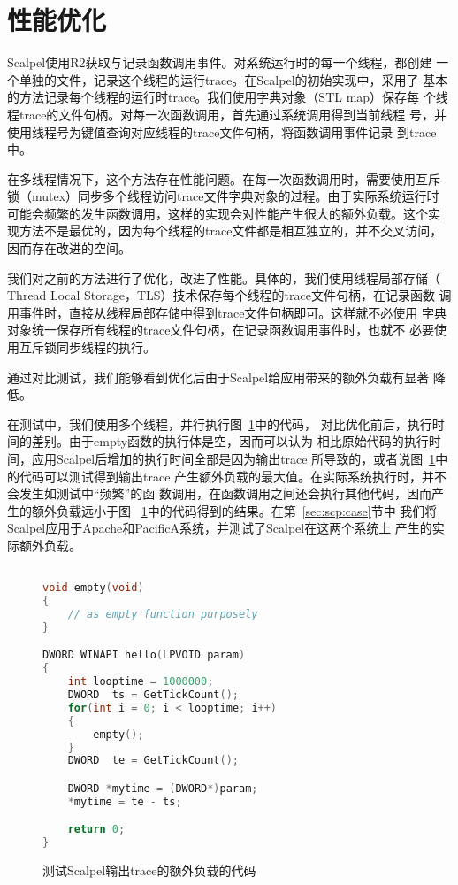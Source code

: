 \section{性能优化}
\label{sec:scp:optimization}

Scalpel使用R2获取与记录函数调用事件。对系统运行时的每一个线程，都创建
一个单独的文件，记录这个线程的运行trace。在Scalpel的初始实现中，采用了
基本的方法记录每个线程的运行时trace。我们使用字典对象（STL map）保存每
个线程trace的文件句柄。对每一次函数调用，首先通过系统调用得到当前线程
号，并使用线程号为键值查询对应线程的trace文件句柄，将函数调用事件记录
到trace中。

在多线程情况下，这个方法存在性能问题。在每一次函数调用时，需要使用互斥
锁（mutex）同步多个线程访问trace文件字典对象的过程。由于实际系统运行时
可能会频繁的发生函数调用，这样的实现会对性能产生很大的额外负载。这个实
现方法不是最优的，因为每个线程的trace文件都是相互独立的，并不交叉访问，
因而存在改进的空间。

我们对之前的方法进行了优化，改进了性能。具体的，我们使用线程局部存储（
Thread Local Storage，TLS）技术保存每个线程的trace文件句柄，在记录函数
调用事件时，直接从线程局部存储中得到trace文件句柄即可。这样就不必使用
字典对象统一保存所有线程的trace文件句柄，在记录函数调用事件时，也就不
必要使用互斥锁同步线程的执行。

通过对比测试，我们能够看到优化后由于Scalpel给应用带来的额外负载有显著
降低。

在测试中，我们使用多个线程，并行执行图~\ref{fig:scp_perfcode}中的代码，
对比优化前后，执行时间的差别。由于empty函数的执行体是空，因而可以认为
相比原始代码的执行时间，应用Scalpel后增加的执行时间全部是因为输出trace
所导致的，或者说图~\ref{fig:scp_perfcode}中的代码可以测试得到输出trace
产生额外负载的最大值。在实际系统执行时，并不会发生如测试中“频繁”的函
数调用，在函数调用之间还会执行其他代码，因而产生的额外负载远小于图~
\ref{fig:scp_perfcode}中的代码得到的结果。在第~\ref{sec:scp:case}节中
我们将Scalpel应用于Apache和PacificA系统，并测试了Scalpel在这两个系统上
产生的实际额外负载。

\begin{figure}[htbp]
\centering
\begin{lstlisting}[language=C++,basicstyle=\small]

void empty(void)
{
	// as empty function purposely
}

DWORD WINAPI hello(LPVOID param)
{
	int looptime = 1000000;
	DWORD  ts = GetTickCount();
	for(int i = 0; i < looptime; i++)
	{
		empty();
	}
	DWORD  te = GetTickCount();

	DWORD *mytime = (DWORD*)param;
	*mytime = te - ts;

	return 0;
}
\end{lstlisting}
\caption{测试Scalpel输出trace的额外负载的代码}
\label{fig:scp_perfcode}
\end{figure}

